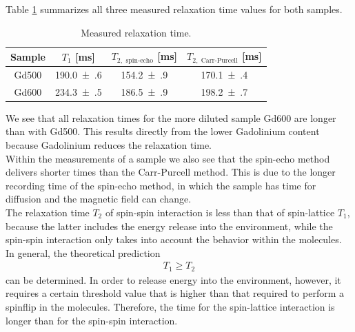 Table \ref{tab:relax} summarizes all three measured relaxation time values for both samples.
\begin{table}[ht]
\centering
\begin{tabular}{cccc}
\toprule
Sample & $T_1$ [ms] & $T_{2,\text{ spin-echo}}$ [ms] & $T_{2,\text{ Carr-Purcell}}$ [ms]\\
\midrule
Gd500 & \num{190.0(6)} & \num{154.2(9)} & \num{170.1(4)}\\
Gd600 & \num{234.3(5)} & \num{186.5(9)} & \num{198.2(7)}\\
\bottomrule
\end{tabular}
\caption{Measured relaxation time.}
\label{tab:relax}
\end{table}
We see that all relaxation times for the more diluted sample Gd600 are longer than with Gd500.
This results directly from the lower Gadolinium content because Gadolinium reduces the relaxation time.\\
Within the measurements of a sample we also see that the spin-echo method delivers shorter times than the Carr-Purcell method.
This is due to the longer recording time of the spin-echo method, in which the sample has time for diffusion and the magnetic field can change.\\
The relaxation time $T_2$ of spin-spin interaction is less than that of spin-lattice $T_1$, because the latter includes the energy release into the environment, while the spin-spin interaction only takes into account the behavior within the molecules.
In general, the theoretical prediction
\begin{align}
T_1\geq T_2
\end{align}
can be determined. 
In order to release energy into the environment, however, it requires a certain threshold value that is higher than that required to perform a spinflip in the molecules.
Therefore, the time for the spin-lattice interaction is longer than for the spin-spin interaction. 



